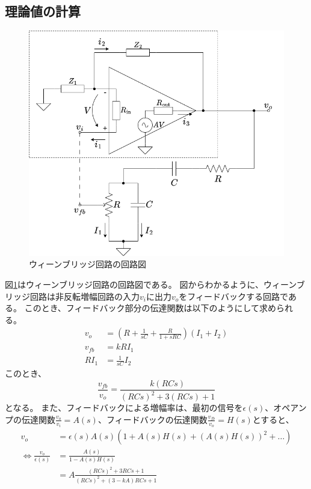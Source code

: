 \documentclass[a4paper]{ltjsarticle}
\begin{document}
\subsection{理論値の計算}
\begin{figure}[htbp]
    \centering
    \includegraphics[width=0.8\columnwidth]{./images/wienbridge.png}
    \caption{ウィーンブリッジ回路の回路図}
    \label{fig:wienbridge_circuit}
\end{figure}
図\ref{fig:wienbridge_circuit}はウィーンブリッジ回路の回路図である。
図からわかるように、ウィーンブリッジ回路は非反転増幅回路の入力$v_i$に出力$v_o$をフィードバックする回路である。
このとき、フィードバック部分の伝達関数は以下のようにして求められる。
\begin{align}
    v_o &= \left( R+\frac{1}{sC}+\frac{R}{1+sRC} \right)(I_1+I_2) \\
    v_{fb} &= kRI_1 \\
    RI_1 &= \frac{1}{sC}I_2
\end{align}
このとき、
\begin{equation}
    \frac{v_{fb}}{v_o} = \frac{k(RCs)}{(RCs)^2+3(RCs)+1}
\end{equation}
となる。
また、フィードバックによる増幅率は、最初の信号を$\epsilon(s)$、オペアンプの伝達関数$\frac{v_o}{v_i}=A(s)$、フィードバックの伝達関数$\frac{v_{fb}}{v_o}=H(s)$とすると、
\begin{align}
    v_o &= \epsilon(s)A(s)\left( 1+A(s)H(s)+\left( A(s)H(s) \right)^2 + \dots \right) \nonumber \\
    \Leftrightarrow \frac{v_o}{\epsilon(s)} &= \frac{A(s)}{1-A(s)H(s)} \nonumber \\
    &= A\frac{(RCs)^2+3RCs+1}{(RCs)^2+(3-kA)RCs+1}
\end{align}
\end{document}
